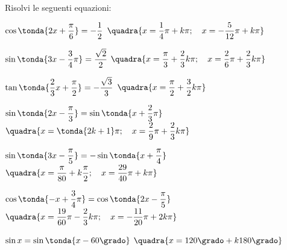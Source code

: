 \begin{esercizio}\label{ese:03.1}
Risolvi le seguenti equazioni:
 \begin{enumeratea}
  \item \(\cos \tonda{2x + \dfrac{\pi}{6}} = -\dfrac{1}{2}\)
   \hfill \(\quadra{x = \dfrac{1}{4}\pi + k \pi; \quad
                   x = -\dfrac{5}{12}\pi + k \pi}\)
  \item \(\sin \tonda{3 x - \dfrac{3}{4} \pi}= \dfrac{\sqrt{2}}{2}\)
   \hfill \(\quadra{x = \dfrac{\pi}{3} + \dfrac{2}{3} k \pi; \quad
                   x = \dfrac{2}{6}\pi + \dfrac{2}{3} k \pi}\)
  \item \(\tan \tonda{\dfrac{2}{3} x + \dfrac{\pi}{2}} = -\dfrac{\sqrt{3}}{3}\)
   \hfill \(\quadra{x = \dfrac{\pi}{2} + \dfrac{3}{2} k \pi}\)
  \item \(\sin \tonda{2 x - \dfrac{\pi}{3}} = \sin \tonda{x + \dfrac{2}{3}\pi}\)
   \hfill \(\quadra{x = \tonda{2k +1} \pi; \quad
                   x = \dfrac{2}{9}\pi + \dfrac{2}{3} k \pi}\)
  \item \(\sin \tonda{3 x - \dfrac{\pi}{5}} = - \sin \tonda{x + \dfrac{\pi}{4}}\)
   \hfill \(\quadra{x = \dfrac{\pi}{80} + k \dfrac{\pi}{2}; \quad
                   x = \dfrac{29}{40}\pi + k \pi}\)
  \item \(\cos \tonda{-x + \dfrac{3}{4}\pi} = \cos \tonda{2 x - \dfrac{\pi}{5}}\)
   \hfill \(\quadra{x = \dfrac{19}{60}\pi - \dfrac{2}{3} k \pi; \quad
                   x = - \dfrac{11}{20}\pi + 2 k \pi}\)
  \item \(\sin x = \sin \tonda{x - 60 \grado}\)
   \hfill \(\quadra{x = 120 \grado + k 180 \grado}\)
 \end{enumeratea}
\end{esercizio}

